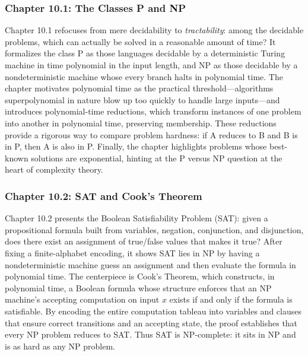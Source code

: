 \documentclass{article}
\begin{document}
\subsubsection{Chapter 10.1: The Classes P and NP}
Chapter 10.1 refocuses from mere decidability to \emph{tractability}: among the decidable problems, which can actually be solved in a reasonable amount of time?  It formalizes the class P as those languages decidable by a deterministic Turing machine in time polynomial in the input length, and NP as those decidable by a nondeterministic machine whose every branch halts in polynomial time.  The chapter motivates polynomial time as the practical threshold—algorithms superpolynomial in nature blow up too quickly to handle large inputs—and introduces polynomial-time reductions, which transform instances of one problem into another in polynomial time, preserving membership.  These reductions provide a rigorous way to compare problem hardness: if A reduces to B and B is in P, then A is also in P.  Finally, the chapter highlights problems whose best-known solutions are exponential, hinting at the P versus NP question at the heart of complexity theory.

\subsubsection{Chapter 10.2: SAT and Cook’s Theorem}
Chapter 10.2 presents the Boolean Satisfiability Problem (SAT): given a propositional formula built from variables, negation, conjunction, and disjunction, does there exist an assignment of true/false values that makes it true?  After fixing a finite‐alphabet encoding, it shows SAT lies in NP by having a nondeterministic machine guess an assignment and then evaluate the formula in polynomial time.  The centerpiece is Cook’s Theorem, which constructs, in polynomial time, a Boolean formula whose structure enforces that an NP machine’s accepting computation on input $x$ exists if and only if the formula is satisfiable.  By encoding the entire computation tableau into variables and clauses that ensure correct transitions and an accepting state, the proof establishes that every NP problem reduces to SAT.  Thus SAT is NP-complete: it sits in NP and is as hard as any NP problem.
\end{document}
